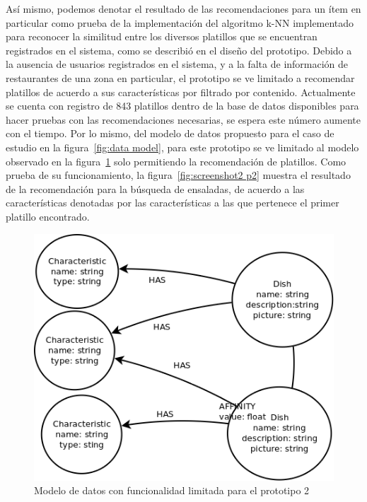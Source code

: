     Así mismo, podemos denotar el resultado de las recomendaciones para un ítem en particular como prueba de la implementación del algoritmo k-NN implementado para reconocer la similitud entre los diversos platillos que se encuentran registrados en el sistema, como se describió en el diseño del prototipo. Debido a la ausencia de usuarios registrados en el sistema, y a la falta de información de restaurantes de una zona en particular, el prototipo se ve limitado a recomendar platillos de acuerdo a sus características por filtrado por contenido. Actualmente se cuenta con registro de 843 platillos dentro de la base de datos disponibles para hacer pruebas con las recomendaciones necesarias, se espera este número aumente con el tiempo. Por lo mismo, del modelo de datos propuesto para el caso de estudio en la figura~\ref{fig:data model}, para este prototipo se ve limitado al modelo observado en la figura~\ref{fig:p2 db} solo permitiendo la recomendación de platillos. Como prueba de su funcionamiento, la figura~\ref{fig:screenshot2 p2} muestra el resultado de la recomendación para la búsqueda de ensaladas, de acuerdo a las características denotadas por las características a las que pertenece el primer platillo encontrado. 

      \begin{figure}[h!]
          \centering
          \includegraphics[width=16cm]{./images/p2_model}
          \caption{Modelo de datos con funcionalidad limitada para el prototipo 2}
          \label{fig:p2 db}
        \end{figure}

